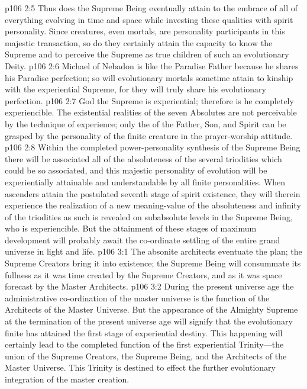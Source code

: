 \vs p106 2:5 Thus does the Supreme Being eventually attain to the embrace of all of everything evolving in time and space while investing these qualities with spirit personality. Since creatures, even mortals, are personality participants in this majestic transaction, so do they certainly attain the capacity to know the Supreme and to perceive the Supreme as true children of such an evolutionary Deity.
\pc \vs p106 2:6 Michael of Nebadon is like the Paradise Father because he shares his Paradise perfection; so will evolutionary mortals sometime attain to kinship with the experiential Supreme, for they will truly share his evolutionary perfection.
\pc \vs p106 2:7 God the Supreme is experiential; therefore is he completely experiencible. The existential realities of the seven Absolutes are not perceivable by the technique of experience; only the  of the Father, Son, and Spirit can be grasped by the personality of the finite creature in the prayer\hyp{}worship attitude.
\vs p106 2:8 Within the completed power\hyp{}personality synthesis of the Supreme Being there will be associated all of the absoluteness of the several triodities which could be so associated, and this majestic personality of evolution will be experientially attainable and understandable by all finite personalities. When ascenders attain the postulated seventh stage of spirit existence, they will therein experience the realization of a new meaning\hyp{}value of the absoluteness and infinity of the triodities as such is revealed on subabsolute levels in the Supreme Being, who is experiencible. But the attainment of these stages of maximum development will probably await the co\hyp{}ordinate settling of the entire grand universe in light and life.
\vs p106 3:1 The absonite architects eventuate the plan; the Supreme Creators bring it into existence; the Supreme Being will consummate its fullness as it was time created by the Supreme Creators, and as it was space forecast by the Master Architects.
\vs p106 3:2 During the present universe age the administrative co\hyp{}ordination of the master universe is the function of the Architects of the Master Universe. But the appearance of the Almighty Supreme at the termination of the present universe age will signify that the evolutionary finite has attained the first stage of experiential destiny. This happening will certainly lead to the completed function of the first experiential Trinity---the union of the Supreme Creators, the Supreme Being, and the Architects of the Master Universe. This Trinity is destined to effect the further evolutionary integration of the master creation.
